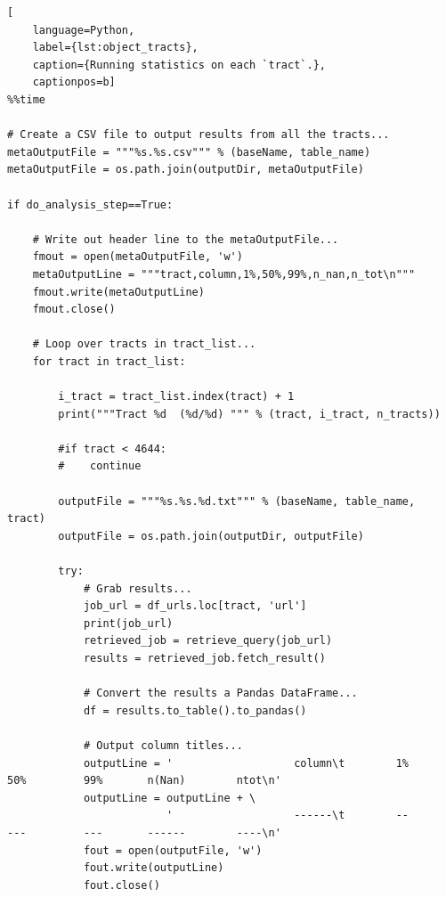 \documentclass[DM,authoryear,toc]{lsstdoc}
\begin{document}
\begin{lstlisting}[
    language=Python,
    label={lst:object_tracts},
    caption={Running statistics on each `tract`.},
    captionpos=b]
%%time

# Create a CSV file to output results from all the tracts...
metaOutputFile = """%s.%s.csv""" % (baseName, table_name)
metaOutputFile = os.path.join(outputDir, metaOutputFile)

if do_analysis_step==True:

    # Write out header line to the metaOutputFile...
    fmout = open(metaOutputFile, 'w')
    metaOutputLine = """tract,column,1%,50%,99%,n_nan,n_tot\n"""
    fmout.write(metaOutputLine)
    fmout.close()

    # Loop over tracts in tract_list...
    for tract in tract_list:
    
        i_tract = tract_list.index(tract) + 1
        print("""Tract %d  (%d/%d) """ % (tract, i_tract, n_tracts))
        
        #if tract < 4644:
        #    continue

        outputFile = """%s.%s.%d.txt""" % (baseName, table_name, tract)
        outputFile = os.path.join(outputDir, outputFile)
    
        try:
            # Grab results...
            job_url = df_urls.loc[tract, 'url']
            print(job_url)
            retrieved_job = retrieve_query(job_url)
            results = retrieved_job.fetch_result()
    
            # Convert the results a Pandas DataFrame...
            df = results.to_table().to_pandas()

            # Output column titles...
            outputLine = '                   column\t        1%         50%         99%       n(Nan)        ntot\n'
            outputLine = outputLine + \
                         '                   ------\t        --         ---         ---       ------        ----\n'
            fout = open(outputFile, 'w')
            fout.write(outputLine)
            fout.close()
    

\end{lstlisting}
\end{document}
